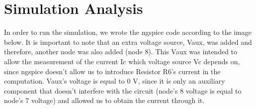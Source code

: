 \section{Simulation Analysis}
\label{sec:simulation}


	In order to run the simulation, we wrote the ngspice code according to the image below. It is important to note that an extra voltage source, Vaux, was added and therefore, another node was also added (node 8). This Vaux was intended to allow the measurement of the current Ic which voltage source Vc depends on, since ngspice doesn't allow us to introduce Resistor R6's current in the computation. Vaux's voltage is equal to 0 V, since it is only an auxiliary component that doesn't interfere with the circuit (node's 8 voltage is equal to node's 7 voltage) and allowed us to obtain the current through it.


